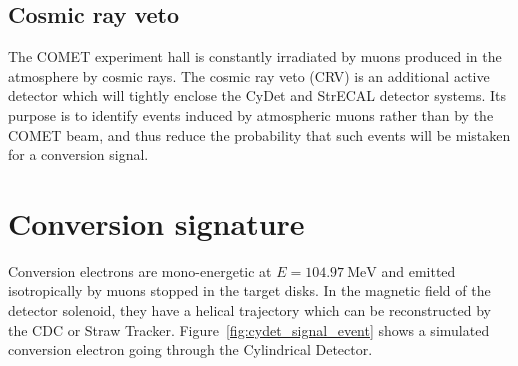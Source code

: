 \subsection{Cosmic ray veto}
\label{sec:crv}
The COMET experiment hall is constantly irradiated by muons produced in the
atmosphere by cosmic rays. The cosmic ray veto (CRV) is an additional active
detector which will tightly enclose the CyDet and StrECAL detector systems. Its
purpose is to identify events induced by atmospheric muons rather than by the
COMET beam, and thus reduce the probability that such events will be mistaken
for a conversion signal.

\section{Conversion signature}
Conversion electrons are mono-energetic at $E=\SI{104.97}{\MeV}$ and emitted
isotropically by muons stopped in the target disks. In the magnetic field of the
detector solenoid, they have a helical trajectory which can be reconstructed by
the CDC or Straw Tracker. Figure~\ref{fig:cydet_signal_event} shows a simulated
conversion electron going through the Cylindrical Detector.



